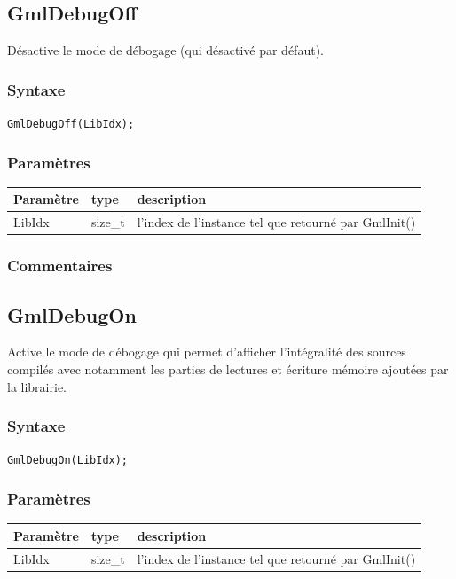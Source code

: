 \documentclass[a4paper,12pt]{article}
\begin{document}
\subsection{GmlDebugOff}

Désactive le mode de débogage (qui désactivé par défaut).

\subsubsection*{Syntaxe}

{\tt GmlDebugOff(LibIdx);}
\subsubsection*{Paramètres}

\begin{tabular}{|m{2cm}|m{1.5cm}|m{10.5cm}|}
\hline
Paramètre  & type    & description \\
\hline
LibIdx     & size\_t & l'index de l'instance tel que retourné par GmlInit() \\
\hline
\end{tabular}
\subsubsection*{Commentaires}


\subsection{GmlDebugOn}

Active le mode de débogage qui permet d'afficher l'intégralité des sources compilés avec notamment les parties de lectures et écriture mémoire ajoutées par la librairie.

\subsubsection*{Syntaxe}

{\tt GmlDebugOn(LibIdx);}

\subsubsection*{Paramètres}

\begin{tabular}{|m{2cm}|m{1.5cm}|m{10.5cm}|}
\hline
Paramètre  & type    & description \\
\hline
LibIdx     & size\_t & l'index de l'instance tel que retourné par GmlInit() \\
\hline
\end{tabular}
\end{document}
